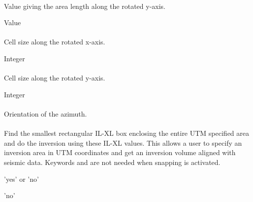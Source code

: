 \paragraph{}
 \slist
   \item \Description Value giving the area length along the rotated y-axis.
   \item \Argument Value
   \item \Default
 \elist

\paragraph{}
 \slist
   \item \Description Cell size along the rotated x-axis.
   \item \Argument Integer
   \item \Default
 \elist

\paragraph{}
 \slist
   \item \Description Cell size along the rotated y-axis.
   \item \Argument Integer
   \item \Default
 \elist

\paragraph{}
 \slist
   \item \Description Orientation of the azimuth.
   \item \Argument
   \item \Default
 \elist

\paragraph{}
\slist
   \item \Description Find the smallest rectangular IL-XL box
     enclosing the entire UTM specified area and do the inversion
     using these IL-XL values. This allows a user to specify an
     inversion area in UTM coordinates and get an inversion volume
     aligned with seismic data. Keywords 
     and  are not needed when snapping
     is activated.
   \item \Argument  'yes' or 'no'
   \item \Default 'no'
 \elist


